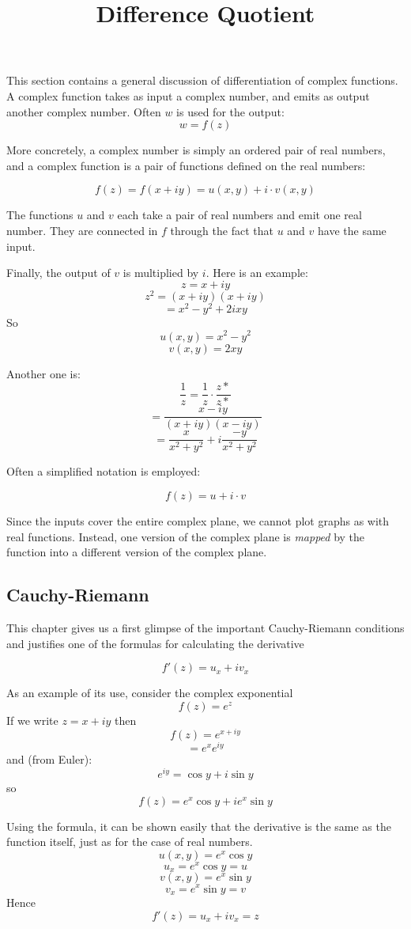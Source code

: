 \documentclass[11pt, oneside]{article}
\title{Difference Quotient}
\date{}
\begin{document}
\maketitle
\Large

This section contains a general discussion of differentiation of complex functions.  A complex function takes as input a complex number, and emits as output another complex number.  Often $w$ is used for the output:
\[ w = f(z) \]

More concretely, a complex number is simply an ordered pair of real numbers, and a complex function is a pair of functions defined on the real numbers:

\[ f(z) = f(x + iy) = u(x,y) + i \cdot v(x,y) \]

The functions $u$ and $v$ each take a pair of real numbers and emit one real number.  They are connected in $f$ through the fact that $u$ and $v$ have the same input.

Finally, the output of $v$ is multiplied by $i$.  Here is an example:
\[ z = x + iy \]
\[ z^2 = (x + iy)(x + iy) \]
\[ = x^2 - y^2 + 2ixy \]
So
\[ u(x,y) = x^2 - y^2 \]
\[ v(x,y) = 2xy \]

Another one is:
\[ \frac{1}{z} = \frac{1}{z} \cdot \frac{z*}{z*} \]
\[ = \frac{x - iy}{(x + iy)(x - iy)} \]
\[ = \frac{x}{x^2 + y^2} + i \frac{-y}{x^2 + y^2} \]

Often a simplified notation is employed:

\[ f(z) = u + i \cdot v \]

Since the inputs cover the entire complex plane, we cannot plot graphs as with real functions.  Instead, one version of the complex plane is \emph{mapped} by the function into a different version of the complex plane.

\subsection*{Cauchy-Riemann}

This chapter gives us a first glimpse of the important Cauchy-Riemann conditions and justifies one of the formulas for calculating the derivative

\[ f'(z) = u_x + i v_x \]

As an example of its use, consider the complex exponential
\[ f(z) = e^z \]
If we write $z = x + iy$ then
\[ f(z) = e^{x + iy} \]
\[ = e^x e^{iy} \]
and (from Euler):
\[ e^{iy} = \cos y + i \sin y \]
so
\[ f(z) = e^x \cos y + i e^x \sin y \]

Using the formula, it can be shown easily that the derivative is the same as the function itself, just as for the case of real numbers.
\[ u(x,y) = e^x \cos y \]
\[ u_x = e^x \cos y = u \]
\[ v(x,y) = e^x \sin y \]
\[ v_x = e^x \sin y = v \]
Hence
\[f'(z) = u_x + iv_x = z \]
\end{document}
